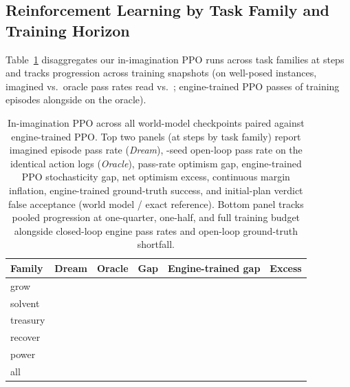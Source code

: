 \subsection{Reinforcement Learning by Task Family and Training Horizon}\label{app:rlfam}

Table~\ref{tab:rlfam} disaggregates our \RlRunsDone{} in-imagination PPO runs across task families at \RlMonths{} steps and tracks progression across training snapshots (on well-posed instances, imagined vs.\ oracle pass rates read \RlDreamWP{} vs.\ \RlOracleWP{}; engine-trained PPO passes \RlEngClosed{} of training episodes alongside \RlEngFull{} on the oracle).

\begin{table}[tbp]
\caption{In-imagination PPO across all \RlCkptsDone{} world-model checkpoints paired against engine-trained PPO. Top two panels (at \RlMonths{} steps by task family) report imagined episode pass rate (\emph{Dream}), \OracleSeeds-seed open-loop pass rate on the identical action logs (\emph{Oracle}), pass-rate optimism gap, engine-trained PPO stochasticity gap, net optimism excess, continuous margin inflation, engine-trained ground-truth success, and initial-plan verdict false acceptance (world model / exact reference). Bottom panel tracks pooled progression at one-quarter, one-half, and full training budget alongside closed-loop engine pass rates and open-loop ground-truth shortfall.}
\label{tab:rlfam}
\centering\scriptsize\setlength{\tabcolsep}{3pt}\renewcommand{\ci}[1]{#1}
\begin{tabular*}{\textwidth}{@{\extracolsep{\fill}}llllll@{}}
\toprule
Family & Dream & Oracle & Gap & Engine-trained gap & Excess \\
\midrule
grow & \RlGrowDream{} & \RlGrowOracle{} & \RlGrowGap{} \ci{\RlGrowGapCI} & \RlEngGrowGap{} \ci{\RlEngGrowGapCI} & \RlGrowGapExcess{} \ci{\RlGrowGapExcessCI} \\
solvent & \RlSolvDream{} & \RlSolvOracle{} & \RlSolvGap{} \ci{\RlSolvGapCI} & \RlEngSolvGap{} \ci{\RlEngSolvGapCI} & \RlSolvGapExcess{} \ci{\RlSolvGapExcessCI} \\
treasury & \RlTreasDream{} & \RlTreasOracle{} & \RlTreasGap{} \ci{\RlTreasGapCI} & \RlEngTreasGap{} \ci{\RlEngTreasGapCI} & \RlTreasGapExcess{} \ci{\RlTreasGapExcessCI} \\
recover & \RlRecovDream{} & \RlRecovOracle{} & \RlRecovGap{} \ci{\RlRecovGapCI} & \RlEngRecovGap{} \ci{\RlEngRecovGapCI} & \RlRecovGapExcess{} \ci{\RlRecovGapExcessCI} \\
power & \RlPowerDream{} & \RlPowerOracle{} & \RlPowerGap{} \ci{\RlPowerGapCI} & \RlEngPowerGap{} \ci{\RlEngPowerGapCI} & \RlPowerGapExcess{} \ci{\RlPowerGapExcessCI} \\
\midrule
all & \RlDream{} & \RlOracle{} & \RlGap{} \ci{\RlGapCI} & \RlEngGap{} \ci{\RlEngGapCI} & \RlGapExcess{} \ci{\RlGapExcessCI} \\
\bottomrule
\end{tabular*}


\end{table}
